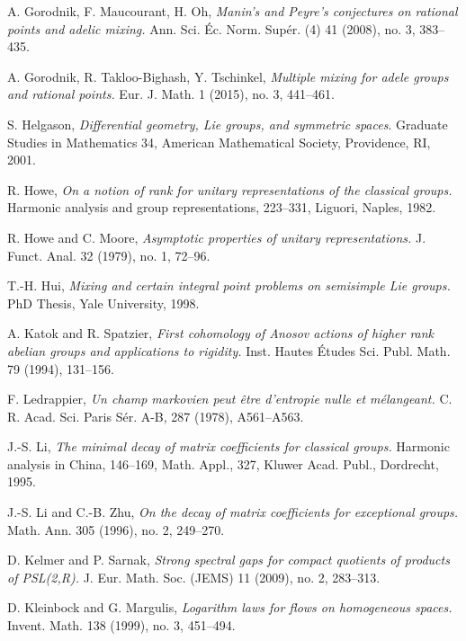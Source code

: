 \documentclass[11pt,reqno,a4paper]{amsart}
\numberwithin{equation}{section}
\theoremstyle{theorem}
\theoremstyle{definition}
\begin{document}
\begin{thebibliography}{99}
A. Gorodnik, F. Maucourant, H. Oh,
\emph{ Manin's and Peyre's conjectures on rational points and adelic mixing. }
 Ann. Sci. \'Ec. Norm. Sup\'er. (4) 41 (2008), no. 3, 383--435.


A. Gorodnik, R. Takloo-Bighash, Y. Tschinkel,
\emph{Multiple mixing for adele groups and rational points.} 
Eur. J. Math. 1 (2015), no. 3, 441--461.

S. Helgason, \emph{Differential geometry, Lie groups, and symmetric spaces}.
 Graduate Studies in Mathematics 34, 
American Mathematical Society, Providence, RI, 2001.


 R. Howe,
\emph{On a notion of rank for unitary representations of the classical groups.} Harmonic analysis and group representations, 223--331, Liguori, Naples, 1982. 

 R. Howe and C. Moore,
\emph{Asymptotic properties of unitary representations. }
J. Funct. Anal. 32 (1979), no. 1, 72--96.

 T.-H. Hui, 
\emph{Mixing and certain integral point problems on semisimple Lie groups. }
PhD Thesis, Yale University, 1998.

A. Katok and R. Spatzier,
\emph{First cohomology of Anosov actions of higher rank abelian groups and applications to rigidity.} 
Inst. Hautes \'Etudes Sci. Publ. Math. 79 (1994), 131--156. 

 F. Ledrappier, \emph{Un champ markovien peut \^etre d'entropie nulle et m\'elangeant.} C. R. Acad. Sci. Paris S\'er. A-B, 287 (1978), A561--A563.

 J.-S. Li,
\emph{The minimal decay of matrix coefficients for classical groups.} Harmonic analysis in China, 146--169, 
Math. Appl., 327, Kluwer Acad. Publ., Dordrecht, 1995. 

 J.-S. Li and C.-B. Zhu, \emph{On the decay of matrix coefficients for exceptional groups.} Math. Ann. 305 (1996), no. 2, 249--270. 

 D. Kelmer and P. Sarnak,
\emph{Strong spectral gaps for compact quotients of products of PSL(2,R).}
J. Eur. Math. Soc. (JEMS) 11 (2009), no. 2, 283--313.

D. Kleinbock and G. Margulis,
\emph{Logarithm laws for flows on homogeneous spaces.}
Invent. Math. 138 (1999), no. 3, 451--494.


\end{thebibliography}
\end{document}
